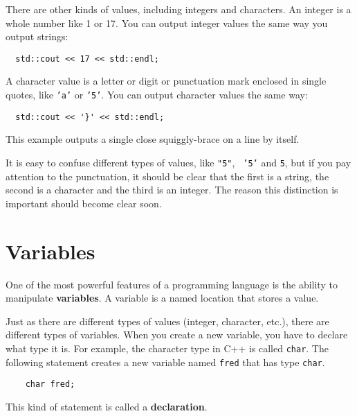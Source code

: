 There are other kinds of values, including integers and characters.
An integer is a whole number like 1 or 17.  You can output
integer values the same way you output strings:

\begin{mdframed}

\begin{verbatim}
  std::cout << 17 << std::endl;
\end{verbatim}
%

\end{mdframed}
A character value is a letter or digit or punctuation mark
enclosed in single quotes, like {\tt 'a'} or {\tt '5'}.
You can output character values the same way:


\begin{mdframed}

\begin{verbatim}
  std::cout << '}' << std::endl;
\end{verbatim}
%

\end{mdframed}
This example outputs a single close squiggly-brace on a line
by itself.

It is easy to confuse different types of values, like {\tt "5"}, {\tt
'5'} and {\tt 5}, but if you pay attention to the punctuation, it
should be clear that the first is a string, the second is a character
and the third is an integer.  The reason this distinction is important
should become clear soon.

\section {Variables}

One of the most powerful features of a programming language is the
ability to manipulate {\bf variables}.  A variable is a named location
that stores a value.  

Just as there are different types of values (integer, character,
etc.), there are different types of variables.  When you create a new
variable, you have to declare what type it is.  For example, the
character type in C++ is called {\tt char}.  The following statement
creates a new variable named {\tt fred} that has type {\tt char}.

\begin{mdframed}

\begin{verbatim}
    char fred;
\end{verbatim}
%

\end{mdframed}
This kind of statement is called a {\bf declaration}.

